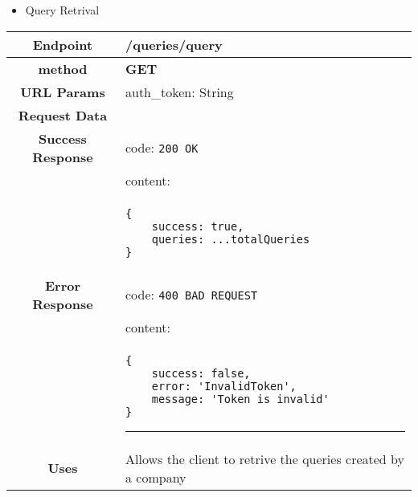     \begin{itemize}
        \item Query Retrival
    \end{itemize}
    \begin{adjustwidth}{1cm}{}
        \begin{longtable}{|c|l|}
            \hline
            \textbf{Endpoint} & /queries/query \\
            \hline
            \textbf{method} & \textbf{GET} \\
            \hline
            \textbf{URL Params} &  auth\_token: String \\
            \hline
            \textbf{Request Data} & \\
            \hline
            \textbf{Success Response} & code: \texttt{200 OK} \\
            &                           content: \\
            & \begin{minipage}[t]{0.5\textwidth}
                \begin{adjustwidth}{1.5cm}{}
                \begin{verbatim}
{
    success: true, 
    queries: ...totalQueries
}
                \end{verbatim}
                \end{adjustwidth}
              \end{minipage} \\
              \hline
            \textbf{Error Response} & code: \texttt{400 BAD REQUEST} \\
              &                     content: \\
              & \begin{minipage}[t]{0.7\textwidth}
                \begin{adjustwidth}{1.5cm}{}
                \begin{verbatim}
{
    success: false, 
    error: 'InvalidToken',
    message: 'Token is invalid'
}
                \end{verbatim}
                \end{adjustwidth}
                \par\noindent\rule{\textwidth}{1pt}
                 \vspace{4pt}
              \end{minipage} \\
              \hline
            \textbf{Uses} & Allows the client to retrive the queries created by a company \\

\end{longtable}
\end{adjustwidth}
